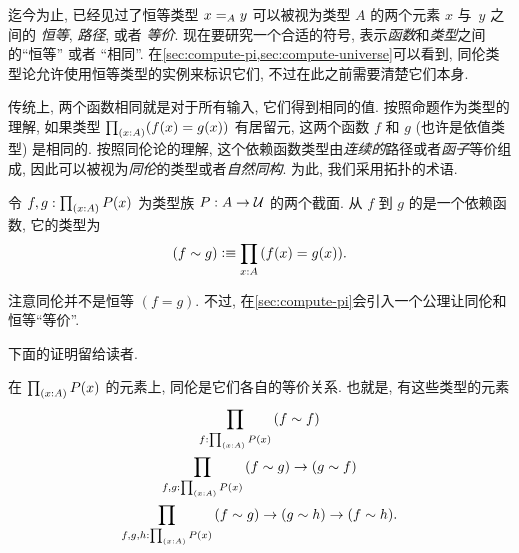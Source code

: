 %

迄今为止, 已经见过了恒等类型 $\id[A]xy$ 可以被视为类型 $A$ 的两个元素 $x$ 与~$y$ 之间的 \emph{恒等}, \emph{路径}, 或者 \emph{等价}.
现在要研究一个合适的符号, 表示\emph{函数}和\emph{类型}之间的``恒等'' 或者 ``相同''.
在\cref{sec:compute-pi,sec:compute-universe}可以看到, 同伦类型论允许使用恒等类型的实例来标识它们, 不过在此之前需要清楚它们本身.

传统上, 两个函数相同就是对于所有输入, 它们得到相同的值.
按照命题作为类型的理解, 如果类型 $\prd{x:A} (f(x)=g(x))$ 有居留元, 这两个函数 $f$ 和 $g$ (也许是依值类型) 是相同的.
按照同伦论的理解, 这个依赖函数类型由\emph{连续的}路径或者\emph{函子}等价组成, 因此可以被视为\emph{同伦}的类型或者\emph{自然同构}.
为此, 我们采用拓扑的术语.

\begin{defn}
    \label{defn:homotopy}
    令 $f,g:\prd{x:A} P(x)$ 为类型族 $P:A\to\type$ 的两个截面.
    从 $f$ 到 $g$ 的是一个依赖函数, 它的类型为
    \begin{equation*}
    (f\htpy g)
        \defeq \prd{x:A} (f(x)=g(x)).
    \end{equation*}
\end{defn}

注意同伦并不是恒等 $(f=g)$.
不过, 在\cref{sec:compute-pi}会引入一个公理让同伦和恒等``等价''.

下面的证明留给读者.

\begin{lem}
    \label{lem:homotopy-props}
    在 $\prd{x:A} P(x)$ 的元素上, 同伦是它们各自的等价关系.
    也就是, 有这些类型的元素
    \begin{gather*}
        \prd{f:\prd{x:A} P(x)} (f\htpy f)\\
        \prd{f,g:\prd{x:A} P(x)} (f\htpy g) \to (g\htpy f)\\
        \prd{f,g,h:\prd{x:A} P(x)} (f\htpy g) \to (g\htpy h) \to (f\htpy h).
    \end{gather*}
\end{lem}


